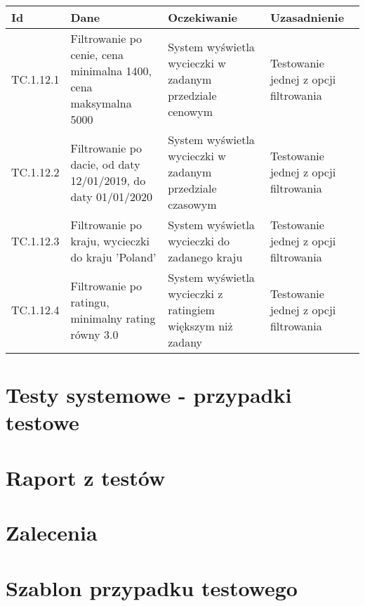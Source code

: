 \documentclass[a4paper,15pt]{article}
\begin{document}
\begin{framed}
\begin{center}
\begin{tabular}{ |C{1.5cm}|C{3cm}|C{4cm}|C{4cm}| } 
 \hline
 \textbf{Id} & \textbf{Dane} & \textbf{Oczekiwanie} & \textbf{Uzasadnienie} \\ \hline
 TC.1.12.1 & Filtrowanie po cenie, cena minimalna 1400, cena maksymalna 5000 & System wyświetla wycieczki w zadanym przedziale cenowym & Testowanie jednej z opcji filtrowania \\ \hline
 TC.1.12.2 & Filtrowanie po dacie, od daty 12/01/2019, do daty 01/01/2020 & System wyświetla wycieczki w zadanym przedziale czasowym & Testowanie jednej z opcji filtrowania \\ \hline
 TC.1.12.3 & Filtrowanie po kraju, wycieczki do kraju 'Poland' & System wyświetla wycieczki do zadanego kraju & Testowanie jednej z opcji filtrowania \\ \hline
 TC.1.12.4 & Filtrowanie po ratingu, minimalny rating równy 3.0 & System wyświetla wycieczki z ratingiem większym niż zadany & Testowanie jednej z opcji filtrowania \\ \hline
\end{tabular}
\end{center}

\end{framed}



\section{Testy systemowe - przypadki testowe}



\section{Raport z testów}

\section{Zalecenia}



\section{Szablon przypadku testowego}
\end{document}
